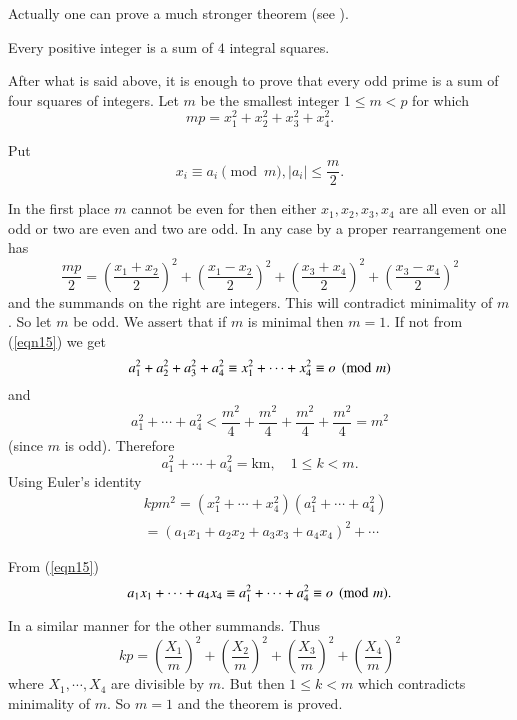 Actually one can prove a much stronger theorem (see \cite{key5}).

\begin{thm}[Lagrange]\label{thm4}
Every positive integer is a sum of $4$ integral squares.
\end{thm}

\begin{Proof}
After what is said above, it is enough to prove that every odd prime is
a sum of four squares of integers. Let $m$ be the smallest integer
$1\leq m <p$ for which 
$$
mp=x^{2}_1+x^{2}_2+x^{2}_3+x^{2}_4.
$$

Put
\begin{equation}\label{eqn15}
x_i\equiv a_i\pmod m, |a_i|\leq \dfrac{m}{2}.
\end{equation}

In the first place $m$ cannot be even for then either
$x_1,x_2,x_3,x_4$ are all even or all odd or two are even and two are
odd. In any case by a proper rearrangement one has
$$
\dfrac{mp}{2}=\left(\dfrac{x_1+x_2}{2}\right)^{2}+\left(\dfrac{x_1-x_2}{2}\right)^{2}+\left(\dfrac{x_3+x_4}{2}\right)^{2} +\left(\dfrac{x_3-x_4}{2}\right)^{2}
$$
and the summands on the right are integers. This will contradict
minimality of $m$. So let $m$ be odd. We assert that if $m$ is minimal
then $m=1$. If not from (\ref{eqn15}) we get
$$
a^{2}_1+a^{2}_2+a^{2}_3+a^{2}_4\equiv x^{2}_1+\cdots + x^{2}_4\equiv
  o \pmod m\\
$$
and
$$
a^{2}_1+\cdots+
a^{2}_4<\dfrac{m^{2}}{4}+\dfrac{m^{2}}{4}+\dfrac{m^{2}}{4}+\dfrac{m^{2}}{4}=m^{2}
$$
(since $m$ is odd). Therefore
$$
a^{2}_1+\cdots+a^{2}_4=\text{km},\quad 1\leq k<m.
$$
Using Euler's identity
\begin{equation}\label{eqn16}
\begin{aligned}
&kpm^{2}=\left(x^{2}_1+\cdots+x^{2}_4\right)\left(a^{2}_1+\cdots+a^{2}_4\right)\\
&=\left(a_1x_1+a_2x_2+a_3x_3+a_4x_4\right)^{2}+\cdots
\end{aligned}
\end{equation}

From (\ref{eqn15})
$$
a_1x_1+\cdots+a_4x_4\equiv a^{2}_1+\cdots + a^{2}_4\equiv o \pmod m.
$$

In a similar manner for the other summands. Thus 
$$
kp=\left(\dfrac{X_1}{m}\right)^{2}+\left(\dfrac{X_2}{m}\right)^{2}+\left(\dfrac{X_3}{m}\right)^{2}+\left(\dfrac{X_4}{m}\right)^{2}   
$$
where $X_1,\cdots,X_4$ are divisible by $m$. But then $1\leq k < m$
which contradicts minimality of $m$. So $m=1$ and the theorem is
proved.
\enprf
\end{Proof}

